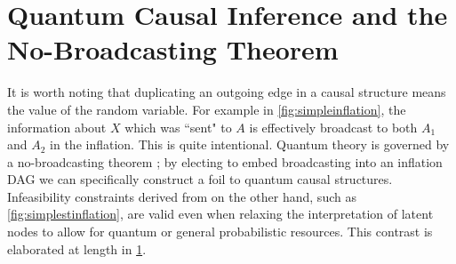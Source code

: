 \section{Quantum Causal Inference and the No-Broadcasting Theorem}\label{sec:classicallity}


It is worth noting that duplicating an outgoing edge in a causal structure means  the value of the random variable. For example in \cref{fig:simpleinflation}, the information about $X$ which was ``sent" to $A$ is effectively broadcast to both $A_1$ and $A_2$ in the inflation. This is quite intentional. Quantum theory is governed by a no-broadcasting theorem \cite{NoCloningQuantum1996,NoCloningGeneral2006}; by electing to embed broadcasting into an inflation DAG we can specifically construct a foil to quantum causal structures. Infeasibility constraints derived from  on the other hand, such as \cref{fig:simplestinflation}, are valid even when relaxing the interpretation of latent nodes to allow for quantum or general probabilistic resources. This contrast is elaborated at length in \cref{sec:classicallity}.  

